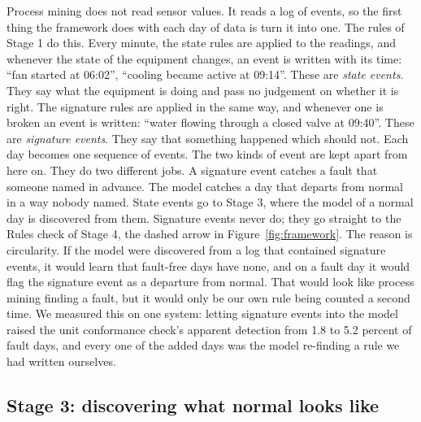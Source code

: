 \documentclass[conference]{IEEEtran}
\begin{document}
Process mining does not read sensor values. It reads a log of events, so the first thing the framework does with each day of data is turn it into one. The rules of Stage 1 do this. Every minute, the state rules are applied to the readings, and whenever the state of the equipment changes, an event is written with its time: ``fan started at 06:02'', ``cooling became active at 09:14''. These are \emph{state events}. They say what the equipment is doing and pass no judgement on whether it is right. The signature rules are applied in the same way, and whenever one is broken an event is written: ``water flowing through a closed valve at 09:40''. These are \emph{signature events}. They say that something happened which should not. Each day becomes one sequence of events. The two kinds of event are kept apart from here on. They do two different jobs. A signature event catches a fault that someone named in advance. The model catches a day that departs from normal in a way nobody named. State events go to Stage 3, where the model of a normal day is discovered from them. Signature events never do; they go straight to the Rules check of Stage 4, the dashed arrow in Figure~\ref{fig:framework}. The reason is circularity. If the model were discovered from a log that contained signature events, it would learn that fault-free days have none, and on a fault day it would flag the signature event as a departure from normal. That would look like process mining finding a fault, but it would only be our own rule being counted a second time. We measured this on one system: letting signature events into the model raised the unit conformance check's apparent detection from 1.8 to 5.2 percent of fault days, and every one of the added days was the model re-finding a rule we had written ourselves.

\subsection{Stage 3: discovering what normal looks like}
\end{document}
